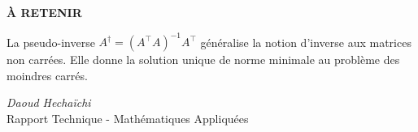 \documentclass[12pt,a4paper]{article}
\newcommand{\T}{^\top}
\newcommand{\pinv}{^\dagger}
\begin{document}
\vspace{0.5cm}

\begin{resultatbox}
\begin{center}
\textbf{\textcolor{bleu}{À RETENIR}}

La pseudo-inverse $A\pinv = (A\T A)^{-1} A\T$ généralise la notion d'inverse aux matrices non carrées. Elle donne la solution unique de norme minimale au problème des moindres carrés.
\end{center}
\end{resultatbox}

\vspace{1.5cm}

\begin{center}
\end{center}

\vspace{1.5cm}

\begin{flushright}
\textit{Daoud Hechaïchi}\\
Rapport Technique - Mathématiques Appliquées
\end{flushright}
\end{document}
